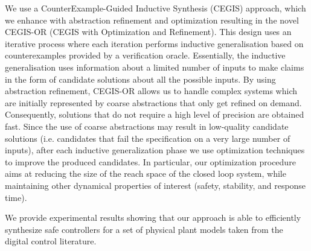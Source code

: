 \documentclass[sigconf]{llncs}
\begin{document}
We use a CounterExample-Guided Inductive Synthesis (CEGIS)
\cite{jha-icse10,DBLP:conf/pldi/Solar-LezamaRBE05} approach,
which we enhance with abstraction refinement and optimization
resulting in the novel CEGIS-OR (CEGIS with Optimization and
Refinement).  This design uses an iterative process where each
iteration performs inductive generalisation based on counterexamples
provided by a verification oracle.  Essentially, the inductive
generalisation uses information about a limited number of inputs to
make claims in the form of candidate solutions about all the possible
inputs.  By using abstraction refinement, CEGIS-OR allows us to handle
complex systems which are initially represented by coarse abstractions
that only get refined on demand.  Consequently, solutions that do not
require a high level of precision are obtained fast.  Since the use
of coarse abstractions may result in low-quality candidate solutions
(i.e. candidates that fail the specification on a very large number of
inputs), after each inductive generalization phase we use optimization
techniques to improve the produced candidates.  In particular, our
optimization procedure aims at reducing the size of the reach space of
the closed loop system, while maintaining other dynamical properties
of interest (safety, stability, and response time).



We provide experimental results showing that our approach is able to
efficiently synthesize safe controllers for a set of physical
plant models taken from the digital control literature.
\end{document}
